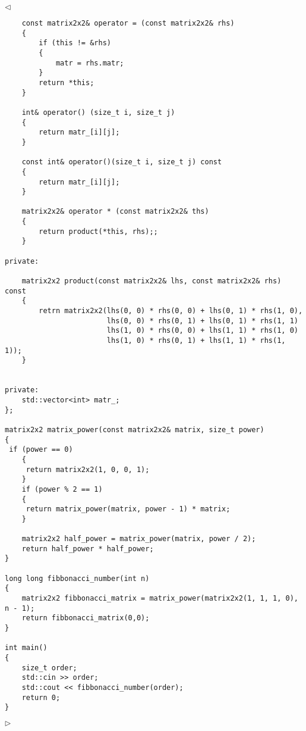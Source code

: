 \documentclass[12pt]{article}
\newenvironment{solution}{\par $\triangleleft$}{$\triangleright$}
\begin{document}
\begin{solution}
\begin{verbatim}
    const matrix2x2& operator = (const matrix2x2& rhs)
    {
        if (this != &rhs)
        {
            matr = rhs.matr;
        }
        return *this;
    }

    int& operator() (size_t i, size_t j)
    {
        return matr_[i][j];
    }

    const int& operator()(size_t i, size_t j) const
    {
        return matr_[i][j];
    }

    matrix2x2& operator * (const matrix2x2& ths)
    {
        return product(*this, rhs);;
    }

private:

    matrix2x2 product(const matrix2x2& lhs, const matrix2x2& rhs) const
    {
        retrn matrix2x2(lhs(0, 0) * rhs(0, 0) + lhs(0, 1) * rhs(1, 0),
                        lhs(0, 0) * rhs(0, 1) + lhs(0, 1) * rhs(1, 1)
                        lhs(1, 0) * rhs(0, 0) + lhs(1, 1) * rhs(1, 0)
                        lhs(1, 0) * rhs(0, 1) + lhs(1, 1) * rhs(1, 1));
    }


private:
    std::vector<int> matr_;
};

matrix2x2 matrix_power(const matrix2x2& matrix, size_t power)
{
 if (power == 0)
    {
     return matrix2x2(1, 0, 0, 1);
    }
    if (power % 2 == 1)
    {
     return matrix_power(matrix, power - 1) * matrix;
    }

    matrix2x2 half_power = matrix_power(matrix, power / 2);
    return half_power * half_power;
}

long long fibbonacci_number(int n)
{
    matrix2x2 fibbonacci_matrix = matrix_power(matrix2x2(1, 1, 1, 0), n - 1);
    return fibbonacci_matrix(0,0);
}

int main()
{
    size_t order;
    std::cin >> order;
    std::cout << fibbonacci_number(order);
    return 0;
}
    \end{verbatim}
\end{solution}
\end{document}
